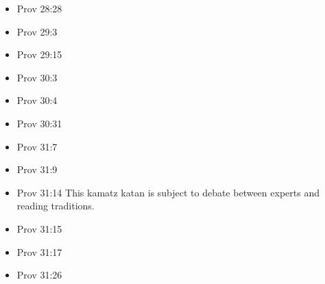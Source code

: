 \documentclass[14pt]{book}
\begin{document}
\begin{multicols}{2}
\begin{itemize}
									\item Prov 28:28
									
									\item Prov 29:3
									
									\item Prov 29:15
									
									\item Prov 30:3
									
									\item Prov 30:4
									
									\item Prov 30:31
									
									\item Prov 31:7
									
									\item Prov 31:9
									
									\item Prov 31:14 This kamatz katan is subject to debate between experts and reading traditions.
									
									\item Prov 31:15
									
									\item Prov 31:17
									
									\item Prov 31:26
									
								\end{itemize}\end{multicols}
							
\end{document}
